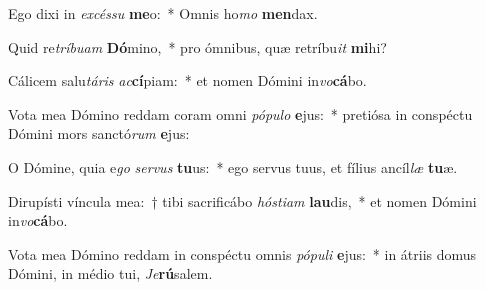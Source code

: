 \item Ego dixi in \textit{ex}\textit{cés}\textit{su} \textbf{me}o:~* Omnis ho\textit{mo} \textbf{men}dax.
\item Quid re\textit{trí}\textit{bu}\textit{am} \textbf{Dó}mino,~* pro ómnibus, quæ retríbu\textit{it} \textbf{mi}hi?
\item Cálicem salu\textit{tá}\textit{ris} \textit{ac}\textbf{cí}piam:~* et nomen Dómini in\textit{vo}\textbf{cá}bo.
\item Vota mea Dómino reddam coram omni \textit{pó}\textit{pu}\textit{lo} \textbf{e}jus:~* pretiósa in conspéctu Dómini mors sanctó\textit{rum} \textbf{e}jus:
\item O Dómine, quia e\textit{go} \textit{ser}\textit{vus} \textbf{tu}us:~* ego servus tuus, et fílius ancíl\textit{læ} \textbf{tu}æ.
\item Dirupísti víncula mea:~† tibi sacrificábo \textit{hós}\textit{ti}\textit{am} \textbf{lau}dis,~* et nomen Dómini in\textit{vo}\textbf{cá}bo.
\item Vota mea Dómino reddam in conspéctu omnis \textit{pó}\textit{pu}\textit{li} \textbf{e}jus:~* in átriis domus Dómini, in médio tui, \textit{Je}\textbf{rú}salem.
